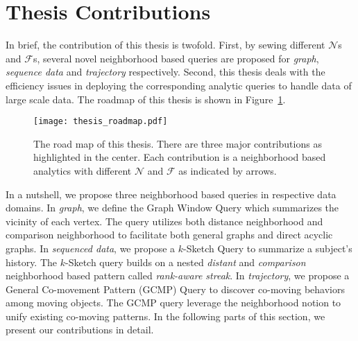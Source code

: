 \section{Thesis Contributions}
In brief, the contribution of this thesis is twofold.
First, by sewing different $\mathcal{N}$s and $\mathcal{F}$s, 
several novel neighborhood based queries are proposed for 
\emph{graph}, \emph{sequence data} and \emph{trajectory} respectively. 
Second, this thesis
deals with the efficiency issues in deploying the corresponding analytic queries to
handle data of large scale data.
The roadmap of this thesis is shown in Figure~\ref{fig:thesis_roadmap}.
\begin{figure}[h]
\centering
\texttt{[image: thesis\_roadmap.pdf]}
\caption{The road map of this thesis. There are three major contributions as highlighted in the center. Each contribution
is a neighborhood based analytics with different $\mathcal{N}$ and $\mathcal{F}$ as indicated by arrows.} 
\label{fig:thesis_roadmap}
\end{figure}

In a nutshell, we propose three neighborhood based queries in respective data domains. 
In \emph{graph}, we define the Graph Window Query which summarizes the vicinity of each vertex.
The query utilizes both distance neighborhood and comparison neighborhood to facilitate both
general graphs and direct acyclic graphs.
%
In \emph{sequenced data}, we propose a $k$-Sketch Query to summarize a subject's history. The $k$-Sketch query builds on a nested \emph{distant} and \emph{comparison} neighborhood based pattern called \emph{rank-aware streak}.
%
In \emph{trajectory}, we propose a General Co-movement Pattern (GCMP) Query to discover co-moving behaviors among moving objects. The GCMP query leverage the neighborhood notion to unify existing co-moving patterns.
%
In the following parts of this section, we present our contributions in detail.


